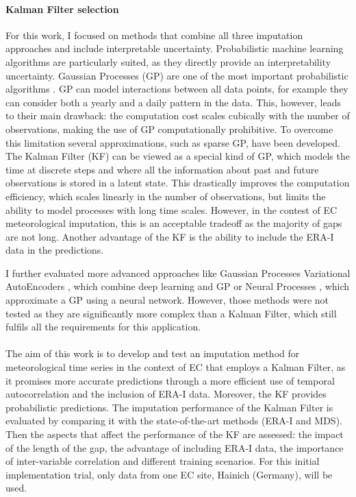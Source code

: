 \documentclass{article}
\begin{document}
\paragraph{Kalman Filter selection}  For this work, I focused on methods that combine all three imputation approaches and include interpretable uncertainty. Probabilistic machine learning algorithms are particularly suited, as they directly provide an interpretability uncertainty.
Gaussian Processes (GP) are one of the most important probabilistic algorithms \cite{2020_hennig_pml}. GP can model interactions between all data points, for example they can consider both a yearly and a daily pattern in the data. This, however, leads to their main drawback: the computation cost scales cubically with the number of observations, making the use of GP computationally prohibitive. To overcome this limitation several approximations, such as sparse GP, have been developed. 
The Kalman Filter (KF) can be viewed as a special kind of GP, which models the time at discrete steps and where all the information about past and future observations is stored in a latent state. This drastically improves the computation efficiency, which scales linearly in the number of observations, but limits the ability to model processes with long time scales. However, in the contest of EC meteorological imputation, this is an acceptable tradeoff as the majority of gaps are not long. Another advantage of the KF is the ability to include the ERA-I data in the predictions.

I further evaluated more advanced approaches like Gaussian Processes Variational AutoEncoders  \cite{fortuin_gp-vae_2020}, which combine deep learning and GP or Neural Processes \cite{garnelo_neural_2018}, which approximate a  GP using a neural network. However, those methods were not tested as they are significantly more complex than a Kalman Filter, which still fulfils all the requirements for this application.  

\paragraph{} The aim of this work is to develop and test an imputation method for meteorological time series in the context of EC that employs a Kalman Filter, as it promises more accurate predictions through a more efficient use of temporal autocorrelation and the inclusion of ERA-I data. Moreover, the KF provides probabilistic predictions.
The imputation performance of the Kalman Filter is evaluated by comparing it with the state-of-the-art methods (ERA-I and MDS). Then the aspects that affect the performance of the KF are assessed: the impact of the length of the gap, the advantage of including ERA-I data, the importance of inter-variable correlation and different training scenarios. For this initial implementation trial, only data from one EC site, Hainich (Germany), will be used.
\end{document}
